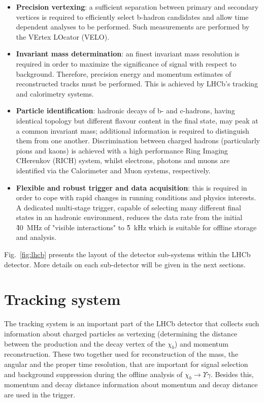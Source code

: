\begin{itemize}

\item {\bf Precision vertexing}: a sufficient separation between primary and 
secondary vertices is required to efficiently select b-hadron candidates 
and allow time dependent analyses to be performed. Such measurements are 
performed by the VErtex LOcator (VELO).

\item {\bf Invariant mass determination}: an finest invariant mass
resolution is required in order to maximize the significance of signal
with respect  to background. Therefore, precision energy and momentum
estimates of reconstructed tracks must be performed. This is achieved by LHCb’s 
tracking  and calorimetry  
systems.

\item {\bf Particle identification}: hadronic decays of b- and c-hadrons, 
having identical topology but different flavour content in the final state, 
may peak at a common invariant mass; additional information is required to 
distinguish them from one another. 
Discrimination between charged hadrons (particularly pions and kaons) is 
achieved with a high performance Ring Imaging CHerenkov (RICH) system, 
whilst electrons, photons and muons are identified via the 
Calorimeter and Muon systems, respectively.

\item {\bf Flexible and robust trigger and data acquisition}: this is required 
in order to cope with rapid changes in running conditions and physics 
interests. A dedicated multi-stage trigger, capable of selecting many different 
final states in an hadronic environment, reduces the data rate from the initial 
\~ 40~MHz of "visible interactions" to \~ 5~kHz which is suitable for 
offline storage and analysis.
\end{itemize}

Fig.~\ref{fig:lhcb} presents the layout of the detector sub-systems 
within the LHCb detector. More details on each sub-detector will be given in 
the next sections.

\section{Tracking system}

The tracking system is an important part of the LHCb detector that collects such
information about charged particles as vertexing (determining the distance
between the production and the decay vertex of the $\chi_b$) and
momentum reconstruction. These two together used for reconstruction of the mass,
the angular and the proper time resolution,  that are important for signal
selection and background suppression during the offline analysis of
$\chi_b \rightarrow \Upsilon \gamma$. Besides this, momentum and decay distance
information about momentum and decay distance are used in the trigger.

